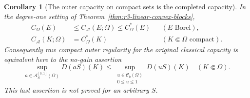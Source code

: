 \documentclass[11pt,a4paper]{article}
\numberwithin{equation}{section}
\newtheorem{corollary}[theorem]{Corollary}
\theoremstyle{definition}
\theoremstyle{remark}
\newcommand{\Cb}{\mathcal C_b}
\begin{document}
\begin{corollary}[The outer capacity on compact sets is the completed capacity]
\label{cor:r3-linear-completed-capacity}
In the degree-one setting of
Theorem~\ref{thm:r3-linear-convex-blocks},
\begin{align}
 C_\Omega(E)&\leq C_{\mathcal A}(E;\Omega)
                   \leq C_\Omega^*(E)
                  &&(E\text{ Borel}),\label{eq:r3-completed-cap-sandwich}\\
 C_{\mathcal A}(K;\Omega)&=C_\Omega^*(K)
                  &&(K\Subset\Omega\text{ compact}).
                  \label{eq:r3-completed-compact-cap}
\end{align}
Consequently raw compact outer regularity for the original
classical capacity is equivalent here to the no-gain assertion
\begin{equation}
\label{eq:r3-completion-no-gain}
 \sup_{a\in\mathcal A_S^{[0,1]}(\Omega)}D(aS)(K)
       \leq
 \sup_{\substack{u\in\Cb(\Omega)\\0\leq u\leq1}}D(uS)(K)
 \quad(K\Subset\Omega).
\end{equation}
This last assertion is not proved for an arbitrary $S$.
\end{corollary}
\end{document}
